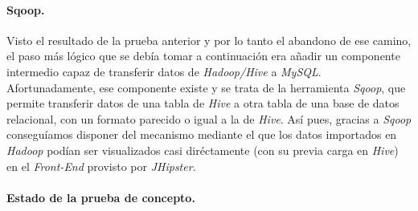 \par
\paragraph*{Sqoop.}
\par
Visto el resultado de la prueba anterior y por lo tanto el abandono de ese camino, el paso más lógico que se debía tomar a continuación era añadir un componente intermedio capaz de transferir datos de \textit{Hadoop/Hive} a \textit{MySQL}. Afortunadamente, ese componente existe y se trata de la herramienta \textit{Sqoop}, que permite transferir datos de una tabla de \textit{Hive} a otra tabla de una base de datos relacional, con un formato parecido o igual a la de \textit{Hive}. Así pues, gracias a \textit{Sqoop} conseguíamos disponer del mecanismo mediante el que los datos importados en \textit{Hadoop} podían ser visualizados casi diréctamente (con su previa carga en \textit{Hive}) en el \textit{Front-End} provisto por \textit{JHipster}. 


\par
\paragraph*{Estado de la prueba de concepto.}

